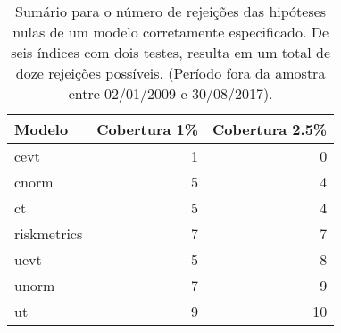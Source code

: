 \begin{table}[H]
\centering
\caption{Sumário para o número de rejeições das hipóteses nulas de um modelo 
corretamente especificado. De seis índices com dois testes, resulta em um total 
de doze rejeições possíveis. (Período fora da amostra entre 02/01/2009 e 30/08/2017).} 
\label{tab:vartest_suma}
\begin{tabular}{lrr}
  \hline
Modelo & Cobertura 1\% & Cobertura 2.5\% \\ 
  \hline
cevt &   1 &   0 \\ 
  cnorm &   5 &   4 \\ 
  ct &   5 &   4 \\ 
  riskmetrics &   7 &   7 \\ 
  uevt &   5 &   8 \\ 
  unorm &   7 &   9 \\ 
  ut &   9 &  10 \\ 
   \hline
\end{tabular}
\end{table}
